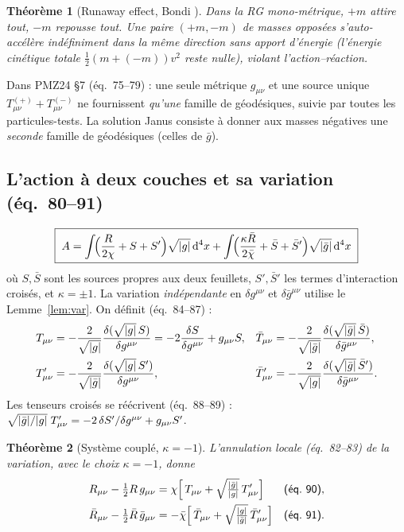 \documentclass[11pt,a4paper]{article}
\theoremstyle{definition}
\theoremstyle{plain}
\newtheorem{theoreme}{Théorème}[section]
\newcommand{\dx}{\,\dd^4x}
\newcommand{\gbar}{\bar{g}}
\newcommand{\Rbar}{\bar{R}}
\newcommand{\Tp}{T'}
\newcommand{\Tbar}{\bar{T}}
\newcommand{\Sbar}{\bar{S}}
\newcommand{\Tbarp}{\bar{T}'}
\newcommand{\chibar}{\bar{\chi}}
\newcommand{\half}{\tfrac{1}{2}}
\newcommand{\eqpaper}[1]{\textsf{(éq.~#1)}}   %
\begin{document}
\begin{theoreme}[Runaway effect, Bondi \cite{Bondi1957}]
Dans la RG \emph{mono-métrique}, $+m$ attire tout, $-m$ repousse tout. Une paire $(+m,-m)$
de masses opposées s'auto-accélère indéfiniment dans la même direction \emph{sans apport
d'énergie} (l'énergie cinétique totale $\half(m+(-m))v^2$ reste nulle), violant l'action--réaction.
\end{theoreme}

Dans PMZ24 \S7 \eqpaper{75--79} : une seule métrique $g_{\mu\nu}$ et une source unique
$T^{(+)}_{\mu\nu}+T^{(-)}_{\mu\nu}$ ne fournissent \emph{qu'une} famille de géodésiques, suivie
par toutes les particules-tests. La solution Janus consiste à donner aux masses négatives une
\emph{seconde} famille de géodésiques (celles de $\gbar$).

\subsection{L'action à deux couches et sa variation \eqpaper{80--91}}

\begin{equation}
\boxed{\;
A=\int\!\Bigl(\frac{R}{2\chi}+S+S'\Bigr)\sqrt{\abs{g}}\dx
+\int\!\Bigl(\frac{\kappa\Rbar}{2\chibar}+\Sbar+\Sbar'\Bigr)\sqrt{\abs{\gbar}}\dx
\;}
\label{eq:action}
\end{equation}
où $S,\Sbar$ sont les sources propres aux deux feuillets, $S',\Sbar'$ les termes
d'interaction croisés, et $\kappa=\pm1$. La variation \emph{indépendante} en $\delta g^{\mu\nu}$
et $\delta\gbar^{\mu\nu}$ utilise le Lemme~\ref{lem:var}. On définit \eqpaper{84--87} :
\begin{align}
T_{\mu\nu}&=-\frac{2}{\sqrt{\abs{g}}}\frac{\delta(\sqrt{\abs{g}}\,S)}{\delta g^{\mu\nu}}
=-2\frac{\delta S}{\delta g^{\mu\nu}}+g_{\mu\nu}S,
&\Tbar_{\mu\nu}&=-\frac{2}{\sqrt{\abs{\gbar}}}\frac{\delta(\sqrt{\abs{\gbar}}\,\Sbar)}{\delta\gbar^{\mu\nu}},\\
\Tp_{\mu\nu}&=-\frac{2}{\sqrt{\abs{\gbar}}}\frac{\delta(\sqrt{\abs{g}}\,S')}{\delta g^{\mu\nu}},
&\Tbarp_{\mu\nu}&=-\frac{2}{\sqrt{\abs{g}}}\frac{\delta(\sqrt{\abs{\gbar}}\,\Sbar')}{\delta\gbar^{\mu\nu}}.
\end{align}
Les tenseurs croisés se réécrivent \eqpaper{88--89} :
$\sqrt{\abs{\gbar}/\abs{g}}\;\Tp_{\mu\nu}=-2\,\delta S'/\delta g^{\mu\nu}+g_{\mu\nu}S'$.

\begin{theoreme}[Système couplé, $\kappa=-1$]\label{th:couple}
L'annulation locale \eqpaper{82--83} de la variation, avec le choix $\kappa=-1$, donne
\begin{align}
R_{\mu\nu}-\half R\,g_{\mu\nu}
&=\chi\Bigl[\,T_{\mu\nu}+\sqrt{\tfrac{\abs{\gbar}}{\abs{g}}}\,\Tp_{\mu\nu}\Bigr] &\eqpaper{90},
\label{eq:eq90}\\
\Rbar_{\mu\nu}-\half\Rbar\,\gbar_{\mu\nu}
&=-\chibar\Bigl[\,\Tbar_{\mu\nu}+\sqrt{\tfrac{\abs{g}}{\abs{\gbar}}}\,\Tbarp_{\mu\nu}\Bigr] &\eqpaper{91}.
\label{eq:eq91}
\end{align}
\end{theoreme}
\end{document}
